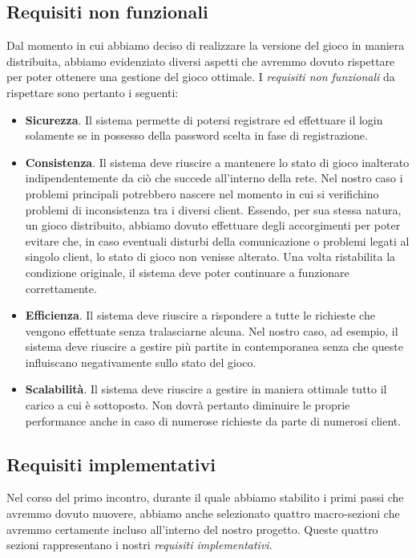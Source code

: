	\clearpage
        \subsection {Requisiti non funzionali}\label{subsec:requirements:notFunctional}
        Dal momento in cui abbiamo deciso di realizzare la versione del gioco in maniera distribuita, abbiamo evidenziato diversi aspetti che avremmo dovuto rispettare per poter ottenere una gestione del gioco ottimale. I \textit{requisiti non funzionali} da rispettare sono pertanto i seguenti:

        \begin{itemize}
        \item \textbf{Sicurezza}. Il sistema permette di potersi registrare ed effettuare il login solamente se in possesso della password scelta in fase di registrazione.
        \item 	\textbf{Consistenza}. Il sistema deve riuscire a mantenere lo stato di gioco inalterato indipendentemente da ciò che succede all'interno della rete. Nel nostro caso i problemi principali potrebbero nascere nel momento in cui si verifichino problemi di inconsistenza tra i diversi client. Essendo, per sua stessa natura, un gioco distribuito, abbiamo dovuto effettuare degli accorgimenti per poter evitare che, in caso eventuali disturbi della comunicazione o problemi legati al singolo client, lo stato di gioco non venisse alterato. Una volta ristabilita la condizione originale, il sistema deve poter continuare a funzionare correttamente.
        \item \textbf{Efficienza}. Il sistema deve riuscire a rispondere a tutte le richieste che vengono effettuate senza tralasciarne alcuna. Nel nostro caso, ad esempio, il sistema deve riuscire a gestire più partite in contemporanea senza che queste influiscano negativamente sullo stato del gioco.
        \item \textbf{Scalabilità}. Il sistema deve riuscire a gestire in maniera ottimale tutto il carico a cui è sottoposto. Non dovrà pertanto diminuire le proprie performance anche in caso di numerose richieste da parte di numerosi client.
        \end{itemize}

        \subsection {Requisiti implementativi}\label{subsec:requirements:implementative}
   	Nel corso del primo incontro, durante il quale abbiamo stabilito i primi passi che avremmo dovuto muovere, abbiamo anche selezionato quattro macro-sezioni che avremmo certamente incluso all'interno del nostro progetto. Queste quattro sezioni rappresentano i nostri \textit{requisiti implementativi}.

